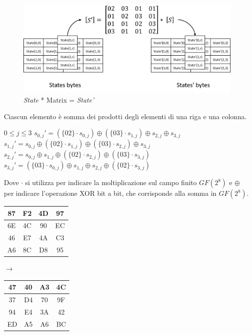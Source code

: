 \documentclass[a4paper,11pt]{article}
\begin{document}
\begin{figure}[H]
    \centering
    \includegraphics[scale=0.4]{mixcolumns}
    \caption{\textit{State} * Matrix = \textit{State'}}
\end{figure}
Ciascun elemento è somma dei prodotti degli elementi di una riga e una colonna.
\begin{center}
    $0 \leq j \leq 3$\bigbreak
    $s_{0, j}' = (\{02\} \cdot s_{0, j}) \oplus (\{03\} \cdot s_{1, j}) \oplus s_{2, j} \oplus s_{3, j}$\bigbreak
    $s_{1, j}' = s_{0, j} \oplus (\{02\} \cdot s_{1, j}) \oplus (\{03\} \cdot s_{2, j}) \oplus s_{3, j}$\bigbreak
    $s_{2, j}' = s_{0, j} \oplus s_{1, j} \oplus (\{02\} \cdot s_{2, j}) \oplus (\{03\} \cdot s_{3, j})$\bigbreak
    $s_{3, j}' = (\{03\} \cdot s_{0, j}) \oplus s_{1, j} \oplus s_{2, j} \oplus (\{02\} \cdot s_{3, j}) $
\end{center}
Dove $\cdot$ si utilizza per indicare la moltiplicazione sul campo finito $GF(2^8)$ e $\oplus$ per indicare l'operazione XOR bit a bit, che corrisponde alla somma in $GF(2^8)$.
\begin{center}
    \begin{tabular}{|c|c|c|c|}
        \hline
        \cellcolor{gray!25}87 & F2 & \cellcolor{gray!25}4D & 97 \\
        \hline 
        \cellcolor{gray!25}6E & 4C & \cellcolor{gray!25}90 & EC \\  
        \hline
        \cellcolor{gray!25}46 & E7 & \cellcolor{gray!25}4A & C3 \\  
        \hline
        \cellcolor{gray!25}A6 & 8C & \cellcolor{gray!25}D8 & 95 \\  
        \hline
    \end{tabular}
    $\rightarrow$
    \begin{tabular}{|c|c|c|c|}
        \hline
        \cellcolor{gray!25}47 & 40 & \cellcolor{gray!25}A3 & 4C \\
        \hline 
        \cellcolor{gray!25}37 & D4 & \cellcolor{gray!25}70 & 9F \\  
        \hline
        \cellcolor{gray!25}94 & E4 & \cellcolor{gray!25}3A & 42 \\  
        \hline
        \cellcolor{gray!25}ED & A5 & \cellcolor{gray!25}A6 & BC \\  
        \hline
    \end{tabular}
\end{center}
\end{document}
